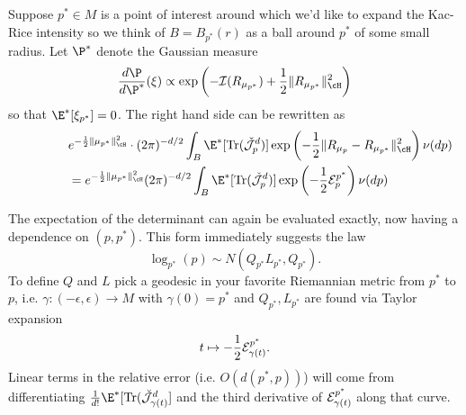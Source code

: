 \documentclass{article}
\begin{document}
Suppose $p^* \in M$ is a point of interest around which we'd like to expand the Kac-Rice intensity so we think of
$B=B_{p^*}(r)$ as a ball around $p^*$ of some small radius. Let
$\P^*$ denote the Gaussian measure
$$
\frac{d\P}{d\P^{*}}(\xi) \propto \exp\left(-{\cal I}(R_{\mu_{p^*}}) + \frac{1}{2} \|R_{\mu_{p^*}}\|^2_{\cH} \right)
$$
 so that $\E^{*}[\xi_{p^*}]=0$. The right hand side can be rewritten  as
 \begin{equation}
   \label{eq:general:form}
\begin{aligned}
  \lefteqn{e^{-\frac{1}{2} \|\mu_{p^*}\|^2_{\cH}} \cdot (2 \pi)^{-d/2}\int_{B} \E^{*}[ \text{Tr}(\check{\cal J}^d_p)]  \exp\left(-\frac{1}{2} \|R_{\mu_p} - R_{\mu_{p^*}}\|^2_{\cH} \right) \nu(dp)} \\
  & = e^{-\frac{1}{2} \|\mu_{p^*}\|^2_{\cH}} (2 \pi)^{-d/2}\int_{B} \E^{*}[ \text{Tr}(\check{\cal J}^d_p)]  \exp\left(-\frac{1}{2} {\cal E}^{p^*}_p  \right) \nu(dp)
\end{aligned}
\end{equation}

The expectation of the determinant can again be evaluated exactly, now having a dependence on $(p,p^*)$. This form immediately suggests the law
\begin{equation}
  \label{eq:gaussian}
 \log_{p^*}(p) \sim N\left(Q_{p^*}L_{p^*}, Q_{p^*}\right).
\end{equation}
To define $Q$ and $L$ pick a geodesic in your favorite Riemannian metric from $p^*$ to $p$, i.e. $\gamma:(-\epsilon,\epsilon) \to M$ with $\gamma(0)=p^*$ and $Q_{p^*}, L_{p^*}$ are found via Taylor expansion
 $$
t \mapsto   -\frac{1}{2} {\cal E}^{p^*}_{\gamma(t)}.
 $$
Linear terms in the relative error (i.e. $O(d(p^*,p))$) will come from differentiating $\frac{1}{d!}\E^*[\text{Tr}(\breve{\cal J}^d_{\gamma(t)}]$ and the third derivative of ${\cal E}^{p^*}_{\gamma(t)}$ along that curve.
\end{document}
